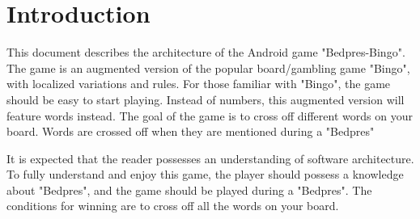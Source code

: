 \section{Introduction} 
\label{sec:introduction}

This document describes the architecture of the Android game "Bedpres-Bingo". The game is an augmented version of the popular board/gambling game "Bingo", with localized variations and rules. For those familiar with "Bingo", the game should be easy to start playing. Instead of numbers, this augmented version will feature words instead. The goal of the game is to cross off different words on your board. Words are crossed off when they are mentioned during a "Bedpres"

It is expected that the reader possesses an understanding of software architecture. To fully understand and enjoy this game, the player should possess a knowledge about "Bedpres", and the game should be played during a "Bedpres". The conditions for winning are to cross off all the words on your board.